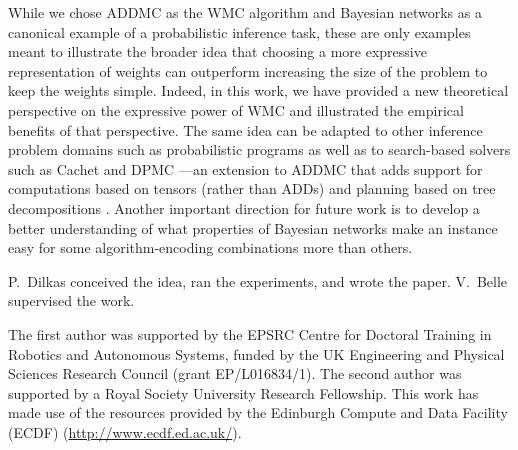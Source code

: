\documentclass[accepted]{uai2021}
\theoremstyle{definition}
\begin{document}
While we chose \textsf{ADDMC} \citep{DBLP:conf/aaai/DudekPV20} as the WMC
algorithm and Bayesian networks as a canonical example of a probabilistic
inference task, these are only examples meant to illustrate the broader idea
that choosing a more expressive representation of weights can outperform
increasing the size of the problem to keep the weights simple. Indeed, in this
work, we have provided a new theoretical perspective on the expressive power of
WMC and illustrated the empirical benefits of that perspective. The same idea
can be adapted to other inference problem domains such as probabilistic programs
\citep{DBLP:journals/tplp/FierensBRSGTJR15,DBLP:journals/corr/abs-2005-09089} as
well as to search-based solvers such as \textsf{Cachet}
\citep{DBLP:conf/sat/SangBBKP04} and \textsf{DPMC} ---an extension to
\textsf{ADDMC} that adds support for computations based on tensors (rather than
ADDs) and planning based on tree decompositions \cite{DBLP:conf/cp/DudekPV20}.
Another important direction for future work is to develop a better understanding
of what properties of Bayesian networks make an instance easy for some
algorithm-encoding combinations more than others.

\begin{contributions}
    P.~Dilkas conceived the idea, ran the experiments, and wrote the paper.
    V.~Belle supervised the work.
\end{contributions}

\begin{acknowledgements}
  The first author was supported by the EPSRC Centre for Doctoral Training in
  Robotics and Autonomous Systems, funded by the UK Engineering and Physical
  Sciences Research Council (grant EP/L016834/1). The second author was
  supported by a Royal Society University Research Fellowship. This work has
  made use of the resources provided by the Edinburgh Compute and Data Facility
  (ECDF) (\url{http://www.ecdf.ed.ac.uk/}).
\end{acknowledgements}


\end{document}
